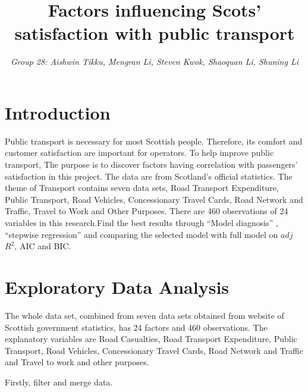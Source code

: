 \documentclass[
]{article}
\title{\textbf{Factors influencing Scots' satisfaction with public
transport}}
\author{\emph{Group 28: Aishwin Tikku, Mengran Li, Steven Kwok, Shaoquan
Li, Shuning Li}}
\date{}
\begin{document}
\maketitle

\hypertarget{sec:Intro}{%
\section{Introduction}\label{sec:Intro}}

Public transport is necessary for most Scottish people. Therefore, its
comfort and customer satisfaction are important for operators. To help
improve public transport, The purpose is to discover factors having
correlation with passengers' satisfaction in this project. The data are
from Scotland's official statistics. The theme of Transport contains
seven data sets, Road Transport Expenditure, Public Transport, Road
Vehicles, Concessionary Travel Cards, Road Network and Traffic, Travel
to Work and Other Purposes. There are 460 observations of 24 variables
in this research.Find the best results through ``Model diagnosis'' ,
``stepwise regression'' and comparing the selected model with full model
on \(adj\) \(R^2\), AIC and BIC.

\hypertarget{sec:EDA}{%
\section{Exploratory Data Analysis}\label{sec:EDA}}

The whole data set, combined from seven data sets obtained from website
of Scottish government statistics, has 24 factors and 460 observations.
The explanatory variables are Road Casualties, Road Transport
Expenditure, Public Transport, Road Vehicles, Concessionary Travel
Cards, Road Network and Traffic and Travel to work and other purposes.

Firstly, filter and merge data.
\end{document}
